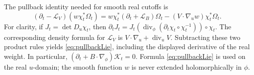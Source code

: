 \documentclass[11pt]{article}
\numberwithin{equation}{section}
\theoremstyle{definition}
\newcommand{\Li}{\mathcal L}
\begin{document}
The pullback identity needed for smooth real cutoffs is
\begin{equation}
 (\partial_t-\Li_V)(w\chi_t^*\Omega_t)
  =w\chi_t^*(\partial_t+\Li_B)\Omega_t
       -(V\cdot\nabla_u w)\chi_t^*\Omega_t.
 \label{eq:pullbackLie}
\end{equation}
For clarity, if \(J_t=\det D_u\chi_t\), then
\(\partial_tJ_t=J_t(\operatorname{div}_\phi
(\partial_t\chi_t\circ\chi_t^{-1}))\circ\chi_t\).
The corresponding density formula for \(\mathcal L_V\) is
\(V\cdot\nabla_u+\operatorname{div}_uV\).
Subtracting these two product rules yields \eqref{eq:pullbackLie},
including the displayed derivative of the real weight. In particular,
\((\partial_t+B\cdot\nabla_\phi)\mathcal K_t=0\).
Formula \eqref{eq:pullbackLie} is used on the real \(u\)-domain;
the smooth function \(w\) is never extended holomorphically in \(\phi\).
\end{document}
